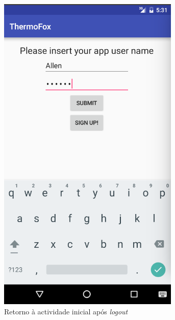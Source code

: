 \documentclass[a4paper]{article}
\begin{document}
\begin{figure}[H]
  \includegraphics[width=0.95\linewidth]{login2.png}
  \caption{Retorno à actividade inicial após \textit{logout}}\label{fig:2}
\endminipage\hfill
{}

\end{figure}
\end{document}
